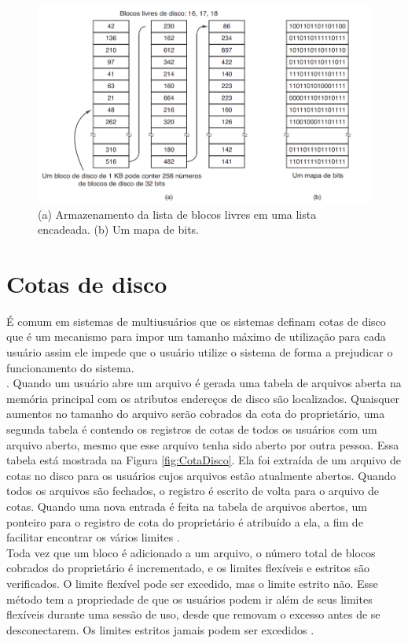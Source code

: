 \begin{figure}[htpb]
    \centering
   \includegraphics[scale=.8]{imagens/GestaoLivre.png}
   \caption{(a) Armazenamento da lista de blocos livres em uma lista encadeada. (b) Um mapa de bits. \cite{Tanenbaum2016}}
   \label{fig:GestaoLivre}
\end{figure} 

\section{Cotas de disco}

É comum em sistemas de multiusuários que os sistemas definam cotas de disco que é um mecanismo para impor um tamanho máximo de utilização para cada usuário assim ele impede que o usuário utilize o sistema de forma a prejudicar o funcionamento do sistema\cite{Tanenbaum2016}. \\. 
Quando um usuário abre um arquivo é gerada uma tabela de arquivos aberta na memória principal com os atributos endereços de disco são localizados. Quaisquer aumentos no tamanho do arquivo serão cobrados da cota do proprietário, uma segunda tabela é contendo os registros de cotas de todos os usuários com um arquivo aberto, mesmo que esse arquivo tenha sido aberto por outra pessoa. Essa tabela está mostrada na Figura \ref{fig:CotaDisco}. Ela foi extraída de um arquivo de cotas no disco para os usuários cujos arquivos estão atualmente abertos. Quando todos os arquivos são fechados, o registro é escrito de volta para o arquivo de cotas. Quando uma nova entrada é feita na tabela de arquivos abertos, um ponteiro para o registro de cota do proprietário é atribuído a ela, a fim de facilitar encontrar os vários limites \cite{Tanenbaum2016}. \\
Toda vez que um bloco é adicionado a um arquivo, o número total de blocos cobrados do proprietário é incrementado, e os limites flexíveis e estritos são verificados. O limite flexível pode ser excedido, mas o limite estrito não. Esse método tem a propriedade de que os usuários podem ir além de seus limites flexíveis durante uma sessão de uso, desde que removam o excesso antes de se desconectarem. Os limites estritos jamais podem ser excedidos \cite{Tanenbaum2016}.

